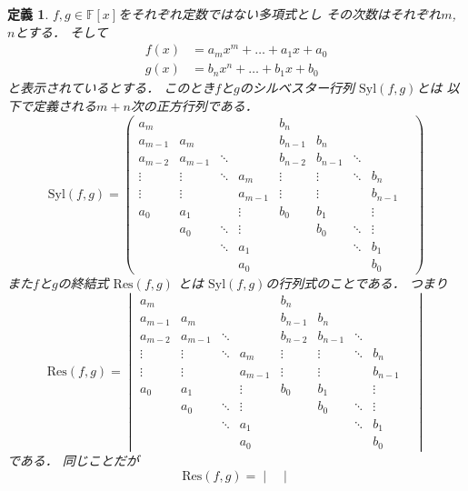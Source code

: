 \documentclass[leqno, a4paper, 12pt]{jsarticle}
\newtheorem{df}[thm]{定義}
\newcommand{\myfi}{\mathbb{F}}
\newcommand{\mysyl}{\mathrm{Syl}}
\newcommand{\myres}{\mathrm{Res}}
\begin{document}
\begin{df}\label{df:resultant}
$f, g \in \myfi[x]$をそれぞれ定数ではない多項式とし
その次数はそれぞれ$m$, $n$とする．
そして
\begin{align}
f(x)&=a_{m}x^{m}+\dots+a_{1}x+a_{0}\\
g(x)&=b_{n}x^{n}+\dots +b_{1}x+b_{0}
\end{align}
と表示されているとする．
このとき$f$と$g$のシルベスター行列
$\mysyl(f, g)$とは
以下で定義される$m+n$次の正方行列である．
\[
\mysyl(f, g)=
\begin{pmatrix}
a_{m}    &         &     &     & b_{n}   &         &     &     &  \\
a_{m-1} & a_{m}&     &     & b_{n-1}& b_{n} &     &    & \\
a_{m-2} & a_{m-1}&  \ddots&     & b_{n-2} & b_{n-1}& \ddots &    &\\
\vdots & \vdots &  \ddots& a_{m}&\vdots & \vdots&  \ddots& b_{n}&\\
\vdots&\vdots&   &    a_{m-1}& \vdots & \vdots & & b_{n-1}& \\
a_{0} & a_{1} & &  \vdots & b_{0} & b_{1} & &\vdots &  \\
   & a_{0}  & \ddots & \vdots &  & b_{0}& \ddots& \vdots & \\
   &   &\ddots & a_{1}&  & & \ddots& b_{1}&\\
   & & & a_{0} & & & & b_{0}& 
\end{pmatrix}
\]
また$f$と$g$の終結式 $\myres(f, g)$ とは
$\mysyl(f, g)$の行列式のことである．
つまり
\[
\myres(f, g)=
\begin{vmatrix}
a_{m}    &         &     &     & b_{n}   &         &     &     &  \\
a_{m-1} & a_{m}&     &     & b_{n-1}& b_{n} &     &    & \\
a_{m-2} & a_{m-1}&  \ddots&     & b_{n-2} & b_{n-1}& \ddots &    &\\
\vdots & \vdots &  \ddots& a_{m}&\vdots & \vdots&  \ddots& b_{n}&\\
\vdots&\vdots&   &    a_{m-1}& \vdots & \vdots & & b_{n-1}& \\
a_{0} & a_{1} & &   \vdots& b_{0} & b_{1} & & \vdots&  \\
   & a_{0}  & \ddots & \vdots &  & b_{0}& \ddots& \vdots & \\
   &   &\ddots & a_{1}&  & & \ddots& b_{1}&\\
   & & & a_{0} & & & & b_{0}& 
\end{vmatrix}
\]
である．
同じことだが
\[
\myres(f, g)=
\begin{vmatrix}

\end{vmatrix}\]
\end{df}
\end{document}
